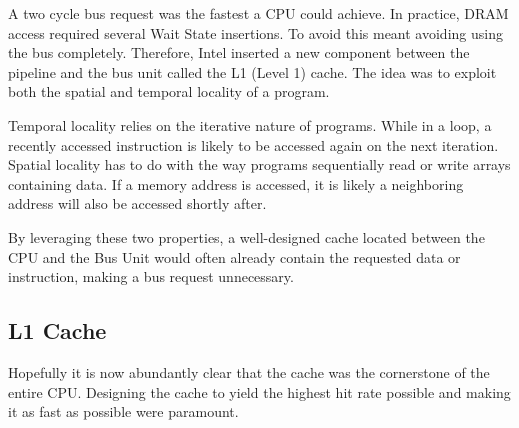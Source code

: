 \par
{}
\par
A two cycle bus request was the fastest a CPU could achieve. In practice, DRAM access required several Wait State insertions.
To avoid this meant avoiding using the bus completely. Therefore, Intel inserted a new component between the pipeline and the bus unit called the L1 (Level 1) cache. The idea was to exploit both the spatial and temporal locality of a program.\\
\par
Temporal locality relies on the iterative nature of programs. While in a loop, a recently accessed instruction is likely to be accessed again on the next iteration. Spatial locality has to do with the way programs sequentially read or write arrays containing data. If a memory address is accessed, it is likely a neighboring address will also be accessed shortly after.\\
\par
By leveraging these two properties, a well-designed cache located between the CPU and the Bus Unit would often already contain the requested data or instruction, making a bus request unnecessary.\\
\par
{}



\vspace{-20pt}
\subsection{L1 Cache}
Hopefully it is now abundantly clear that the cache was the cornerstone of the entire CPU. Designing the cache to yield the highest hit rate possible and making it as fast as possible were paramount. 

